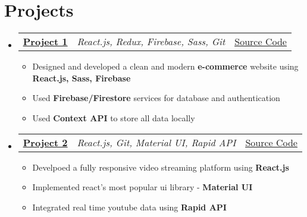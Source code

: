 \documentclass[a4paper,11pt]{article}
\makeatletter
\newcommand{\resumeItem}[1]{
  \item\small{#1}
}
\newcommand{\resumeItemListStart}{\begin{itemize}[rightmargin=0.11in]}
\newcommand{\resumeItemListEnd}{\end{itemize}}
\newcommand{\resumeTrioHeading}[3]{
  \item\small{
    \begin{tabular*}{0.96\textwidth}[t]{
      l@{\extracolsep{\fill}}c@{\extracolsep{\fill}}r
    }
      \textbf{#1} & \textit{#2} & #3
    \end{tabular*}
  }
}
\newcommand{\resumeHeadingListStart}{
  \begin{itemize}[leftmargin=0.15in, label={}]
}
\newcommand{\resumeHeadingListEnd}{\end{itemize}}
\makeatother
\begin{document}



\section{Projects}
  \resumeHeadingListStart{}
    \resumeTrioHeading{\href{https://crownwears.netlify.app/}{\uline{Project 1}}}{React.js, Redux, Firebase, Sass, Git}{\href{https://github.com/Ritam-Biswas/Capstone}{\uline{Source Code}}}
      \resumeItemListStart{}
        \resumeItem{Designed and developed a clean and modern \textbf{e-commerce} website using \textbf{React.js, Sass, Firebase}}
        \resumeItem{Used \textbf{Firebase/Firestore} services for database and authentication}
        \resumeItem{Used \textbf{Context API} to store all data locally}
      \resumeItemListEnd{}

      \resumeTrioHeading{\href{https://streamingtube.netlify.app/}{\uline{Project 2}}}{React.js, Git, Material UI, Rapid API}{\href{https://github.com/Ritam-Biswas/Youtube_Clone}{\uline{Source Code}}}
      \resumeItemListStart{}
        \resumeItem{Develpoed a fully responsive video streaming platform using \textbf{React.js}}
        \resumeItem{Implemented react's most popular ui library - \textbf{Material UI}}
        \resumeItem{Integrated real time youtube data using \textbf{Rapid API}}
      \resumeItemListEnd{}

  \resumeHeadingListEnd{}



\end{document}
